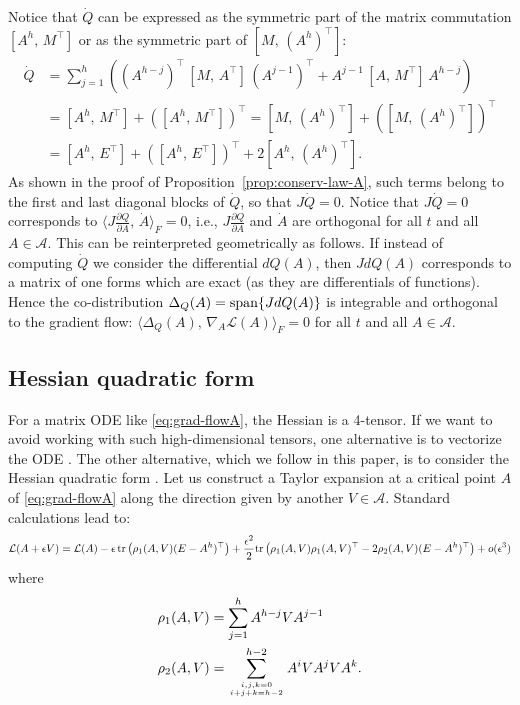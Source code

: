 \documentclass{article}
\def\tr{{\rm tr}}
\newcommand{\1}{\mathds{1}}
\newcommand{\pde}[2]{ \frac{\partial #1}{\partial #2} }
\begin{document}
Notice that $ \dot{Q} $ can be expressed as the symmetric part of the matrix commutation $ [A^h, \, M^\top ] $ or as the symmetric part of $ [M, \, (A^h)^\top ]$:
\begin{align}
\dot{Q} 
& = \sum_{j=1}^h \left( (A^{h-j})^\top \,[ M, \, A^\top ]\, (A^{j-1})^\top + A^{j-1} \,[ A, \, M^\top ]\, A^{h-j} \right) \nonumber \\
&  = [A^h, \, M^\top ] + \left( [A^h, \, M^\top ] \right)^\top = [ M ,\,  (A^h )^\top ] +\left( [ M, \, (A^h )^\top] \right)^\top \nonumber \\
& =  [A^h, \, E^\top ] + \left( [A^h, \, E^\top ]\right)^\top  + 2  [A^h, \, (A^h)^\top ]. \label{eq:dotQ-comm}
\end{align}
As shown in the proof of Proposition~\ref{prop:conserv-law-A}, such terms belong to the first and last diagonal blocks of $ \dot{Q} $, so that $ J\dot{Q} =0$. 
Notice that $ J\dot{Q} =0$ corresponds to $ \langle J \pde{Q}{A} , \, \dot A \rangle_F =0$, i.e., $ J \pde{Q}{A}  $ and $ \dot A $ are orthogonal for all $ t$ and all $ A\in \mathcal{A}$. 
This can be reinterpreted geometrically as follows.
If instead of computing $ \dot Q $ we consider the differential $ d Q(A) $, then $ J dQ(A) $ corresponds to a matrix of one forms which are exact (as they are differentials of functions).
Hence the co-distribution $ \Delta_Q(A) ={\rm span} \{ J d Q(A) \}$ is integrable and orthogonal to the gradient flow: $ \langle \Delta_Q(A), \, \nabla_A \mathcal{L}(A) \rangle_F =0$ for all $ t$ and all $ A\in \mathcal{A}$.


\subsection{Hessian quadratic form}
For a matrix ODE like \eqref{eq:grad-flowA}, the Hessian is a 4-tensor. If we want to avoid working with such high-dimensional tensors, one alternative is to vectorize the ODE \cite{kawaguchi2016deep}.
The other alternative, which we follow in this paper, is to consider the Hessian quadratic form \cite{chitour2018geometric,achour2021loss}. 
Let us construct a Taylor expansion at a critical point $ A$ of \eqref{eq:grad-flowA} along the direction given by another $ V \in \mathcal{A}$.
Standard calculations lead to: 
\[
\mathcal{L}(A+ \epsilon V) = \mathcal{L}(A) - \epsilon \, \tr \left(\rho_1(A, V) (E - A^h)^\top \right) + \frac{\epsilon^2}{2}  \tr \left(\rho_1(A,V) \rho_1(A,V)^\top  - 2 \rho_2(A,V) (E - A^h)^\top \right) + o(\epsilon^3) 
\]
where 
\begin{align}
\rho_1(A,V) & = \sum_{j=1}^h A^{h-j} V A^{j-1} \label{eq:rho1}
\\
\rho_2(A,V) & = \sum^{h-2}_{ i, j, k =0 \atop i+j+k=h-2 
} A^i V A^j V A^k.
  \label{eq:rho2} 
\end{align}
  
\end{document}

